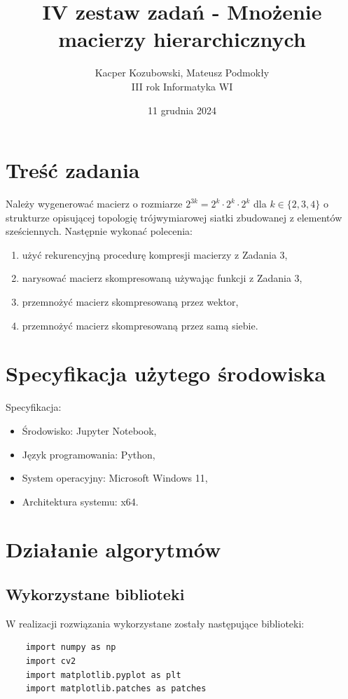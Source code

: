 \documentclass[11pt, leqno]{scrartcl}
\title{IV zestaw zadań - Mnożenie macierzy hierarchicznych}
\author{Kacper Kozubowski, Mateusz Podmokły \\ III
    rok Informatyka WI}
\date{11 grudnia 2024}
\begin{document}
    \maketitle
    \section{Treść zadania}
    Należy wygenerować macierz o rozmiarze $2^{3k}=2^k \cdot 2^k
    \cdot 2^k$ dla $k \in \{2,3,4\}$ o strukturze opisującej
    topologię trójwymiarowej siatki zbudowanej z elementów
    sześciennych. Następnie wykonać polecenia:
    \begin{enumerate}
        \item użyć rekurencyjną procedurę kompresji macierzy
            z Zadania 3,
        \item narysować macierz skompresowaną używając funkcji
            z Zadania 3,
        \item przemnożyć macierz skompresowaną przez wektor,
        \item przemnożyć macierz skompresowaną przez samą siebie.
    \end{enumerate}

    \section{Specyfikacja użytego środowiska}
    Specyfikacja:
    \begin{itemize}
        \item Środowisko: Jupyter Notebook,
        \item Język programowania: Python,
        \item System operacyjny: Microsoft Windows 11,
        \item Architektura systemu: x64.
    \end{itemize}

    \section{Działanie algorytmów}
    \subsection{Wykorzystane biblioteki}
    W realizacji rozwiązania wykorzystane zostały następujące
    biblioteki:
    \begin{lstlisting}
    import numpy as np
    import cv2
    import matplotlib.pyplot as plt
    import matplotlib.patches as patches
    \end{lstlisting}
\end{document}
